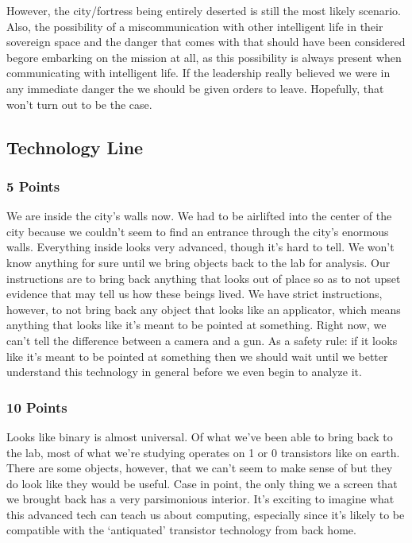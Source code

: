 \documentclass[conference]{IEEEtran}
\begin{document}
However, the city/fortress being entirely deserted is still the most likely scenario. Also, the possibility of a miscommunication with other intelligent life in their sovereign space and the danger that comes with that should have been considered begore embarking on the mission at all, as this possibility is always present when communicating with intelligent life. If the leadership really believed we were in any immediate danger the we should be given orders to leave. Hopefully, that won’t turn out to be the case.  

\subsection{Technology Line}

\subsubsection*{5 Points}

We are inside the city’s walls now. We had to be airlifted into the center of the city because we couldn’t seem to find an entrance through the city’s enormous walls. Everything inside looks very advanced, though it’s hard to tell. We won’t know anything for sure until we bring objects back to the lab for analysis. Our instructions are to bring back anything that looks out of place so as to not upset evidence that may tell us how these beings lived. We have strict instructions, however, to not bring back any object that looks like an applicator, which means anything that looks like it’s meant to be pointed at something. Right now, we can’t tell the difference between a camera and a gun. As a safety rule: if it looks like it’s meant to be pointed at something then we should wait until we better understand this technology in general before we even begin to analyze it. 

\subsubsection*{10 Points}
Looks like binary is almost universal. Of what we’ve been able to bring back to the lab, most of what we’re studying operates on 1 or 0 transistors like on earth. There are some objects, however, that we can’t seem to make sense of but they do look like they would be useful. Case in point, the only thing we a screen that we brought back has a very parsimonious interior. It’s exciting to imagine what this advanced tech can teach us about computing, especially since it’s likely to be compatible with the ‘antiquated’ transistor technology from back home.
\end{document}
